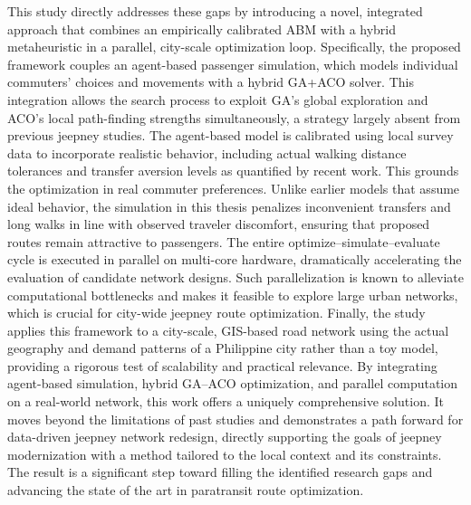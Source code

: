 This study directly addresses these gaps by introducing a novel, integrated approach that combines an empirically calibrated \ac{ABM} with a hybrid metaheuristic in a parallel, city-scale optimization loop. Specifically, the proposed framework couples an agent-based passenger simulation, which models individual commuters’ choices and movements with a hybrid \ac{GA}+\ac{ACO} solver. This integration allows the search process to exploit \ac{GA}’s global exploration and \ac{ACO}’s local path-finding strengths simultaneously, a strategy largely absent from previous jeepney studies. The agent-based model is calibrated using local survey data to incorporate realistic behavior, including actual walking distance tolerances and transfer aversion levels as quantified by recent work. This grounds the optimization in real commuter preferences. Unlike earlier models that assume ideal behavior, the simulation in this thesis penalizes inconvenient transfers and long walks in line with observed traveler discomfort, ensuring that proposed routes remain attractive to passengers. The entire optimize–simulate–evaluate cycle is executed in parallel on multi-core hardware, dramatically accelerating the evaluation of candidate network designs. Such parallelization is known to alleviate computational bottlenecks and makes it feasible to explore large urban networks, which is crucial for city-wide jeepney route optimization. Finally, the study applies this framework to a city-scale, \ac{GIS}-based road network using the actual geography and demand patterns of a Philippine city rather than a toy model, providing a rigorous test of scalability and practical relevance. By integrating agent-based simulation, hybrid \ac{GA}–\ac{ACO} optimization, and parallel computation on a real-world network, this work offers a uniquely comprehensive solution. It moves beyond the limitations of past studies and demonstrates a path forward for data-driven jeepney network redesign, directly supporting the goals of jeepney modernization with a method tailored to the local context and its constraints. The result is a significant step toward filling the identified research gaps and advancing the state of the art in paratransit route optimization.